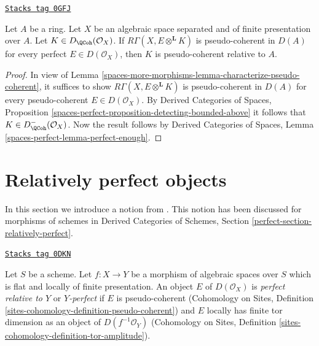 \begin{lemma}
\label{spaces-more-morphisms-lemma-characterize-pseudo-coh-improved}
\href{https://stacks.math.columbia.edu/tag/0GFJ}{\texttt{Stacks tag 0GFJ}}

Let $A$ be a ring. Let $X$ be an algebraic space separated and
of finite presentation over $A$. Let $K \in D_\QCoh(\mathcal{O}_X)$. If
$R \Gamma (X, E \otimes ^{\mathbf{L}} K)$ is
pseudo-coherent in $D(A)$ for every perfect
$E \in D(\mathcal{O}_X)$, then $K$ is pseudo-coherent
relative to $A$.
\end{lemma}

\begin{proof}
In view of Lemma \ref{spaces-more-morphisms-lemma-characterize-pseudo-coherent}, it suffices
to show $R \Gamma (X, E \otimes ^{\mathbf{L}} K)$ is
pseudo-coherent in $D(A)$ for every pseudo-coherent
$E \in D(\mathcal{O}_X)$. By Derived Categories of Spaces,
Proposition \ref{spaces-perfect-proposition-detecting-bounded-above}
it follows that $K \in D^-_\QCoh (\mathcal{O}_X)$. Now the
result follows by Derived Categories of Spaces, Lemma
\ref{spaces-perfect-lemma-perfect-enough}.
\end{proof}

\section{Relatively perfect objects}
\label{spaces-more-morphisms-section-relatively-perfect}
In this section we introduce a notion from \cite{lieblich-complexes}.
This notion has been discussed for morphisms of schemes in
Derived Categories of Schemes, Section
\ref{perfect-section-relatively-perfect}.

\begin{definition}
\label{spaces-more-morphisms-definition-relatively-perfect}
\href{https://stacks.math.columbia.edu/tag/0DKN}{\texttt{Stacks tag 0DKN}}

Let $S$ be a scheme. Let $f : X \to Y$ be a morphism of algebraic spaces
over $S$ which is flat and locally of finite presentation.
An object $E$ of $D(\mathcal{O}_X)$ is {\it perfect relative to $Y$} or
{\it $Y$-perfect} if $E$ is pseudo-coherent
(Cohomology on Sites, Definition
\ref{sites-cohomology-definition-pseudo-coherent}) and
$E$ locally has finite tor dimension as an object of
$D(f^{-1}\mathcal{O}_Y)$
(Cohomology on Sites, Definition
\ref{sites-cohomology-definition-tor-amplitude}).
\end{definition}

